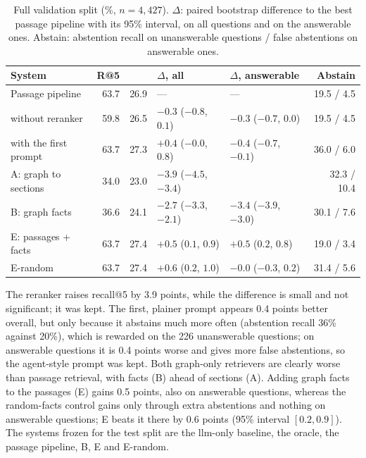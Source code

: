 \begin{table}[ht]
    \centering
    \caption{Full validation split (\%, $n = 4{,}427$). $\Delta$\fone{}: paired bootstrap
    difference to the best passage pipeline with its 95\% interval, on all questions and
    on the answerable ones. Abstain: abstention recall on unanswerable questions / false
    abstentions on answerable ones.}
    \label{tab:final:val}
    \small
    \begin{tabular}{lrrllr}
        \toprule
        System & R@5 & \fone{} & $\Delta$\fone{}, all & $\Delta$\fone{}, answerable & Abstain \\
        \midrule
        Passage pipeline         & 63.7 & 26.9 & ---                       & ---                       & 19.5 / 4.5 \\
        without reranker         & 59.8 & 26.5 & $-0.3$ ($-0.8$, $0.1$)    & $-0.3$ ($-0.7$, $0.0$)    & 19.5 / 4.5 \\
        with the first prompt    & 63.7 & 27.3 & $+0.4$ ($-0.0$, $0.8$)    & $-0.4$ ($-0.7$, $-0.1$)   & 36.0 / 6.0 \\
        A: graph to sections     & 34.0 & 23.0 & $-3.9$ ($-4.5$, $-3.4$)   &                           & 32.3 / 10.4 \\
        B: graph facts           & 36.6 & 24.1 & $-2.7$ ($-3.3$, $-2.1$)   & $-3.4$ ($-3.9$, $-3.0$)   & 30.1 / 7.6 \\
        E: passages + facts      & 63.7 & 27.4 & $+0.5$ ($0.1$, $0.9$)     & $+0.5$ ($0.2$, $0.8$)     & 19.0 / 3.4 \\
        E-random                 & 63.7 & 27.4 & $+0.6$ ($0.2$, $1.0$)     & $-0.0$ ($-0.3$, $0.2$)    & 31.4 / 5.6 \\
        \bottomrule
    \end{tabular}
\end{table}

The reranker raises recall@5 by 3.9 points, while the \fone{} difference is small and not
significant; it was kept. The first, plainer prompt appears 0.4 points better overall,
but only because it abstains much more often (abstention recall 36\% against 20\%), which
is rewarded on the 226 unanswerable questions; on answerable questions it is 0.4 points
worse and gives more false abstentions, so the agent-style prompt was kept. Both
graph-only retrievers are clearly worse than passage retrieval, with facts (B) ahead of
sections (A). Adding graph facts to the passages (E) gains 0.5 points, also on
answerable questions, whereas the random-facts control gains only through extra
abstentions and nothing on answerable questions; E beats it there by 0.6 points (95\%
interval $[0.2, 0.9]$). The systems frozen for the test split are the \gls{llm}-only
baseline, the oracle, the passage pipeline, B, E and E-random.


